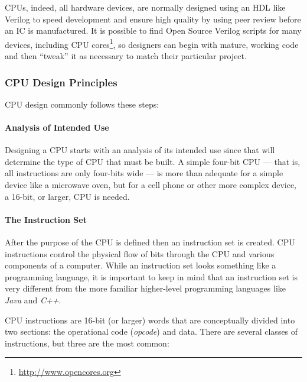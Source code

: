 \acp{CPU}, indeed, all hardware devices, are normally designed using an \ac{HDL} like Verilog to speed development and ensure high quality by using peer review before an \ac{IC} is manufactured. It is possible to find Open Source Verilog scripts for many devices, including \ac{CPU} cores\footnote{\url{http://www.opencores.org}}, so designers can begin with mature, working code and then ``tweak'' it as necessary to match their particular project.

\subsubsection{CPU Design Principles}

\ac{CPU} design commonly follows these steps:

\paragraph{Analysis of Intended Use} Designing a \ac{CPU} starts with an analysis of its intended use since that will determine the type of \ac{CPU} that must be built. A simple four-bit \ac{CPU} --- that is, all instructions are only four-bits wide --- is more than adequate for a simple device like a microwave oven, but for a cell phone or other more complex device, a 16-bit, or larger, \ac{CPU} is needed. 

\paragraph{The Instruction Set} After the purpose of the \ac{CPU} is defined then an instruction set is created. \ac{CPU} instructions control the physical flow of bits through the \ac{CPU} and various components of a computer. While an instruction set looks something like a programming language, it is important to keep in mind that an instruction set is very different from the more familiar higher-level programming languages like \emph{Java} and \emph{C++}.

\ac{CPU} instructions are 16-bit (or larger) words that are conceptually divided into two sections: the operational code (\emph{opcode}) and data. There are several classes of instructions, but three are the most common: 

